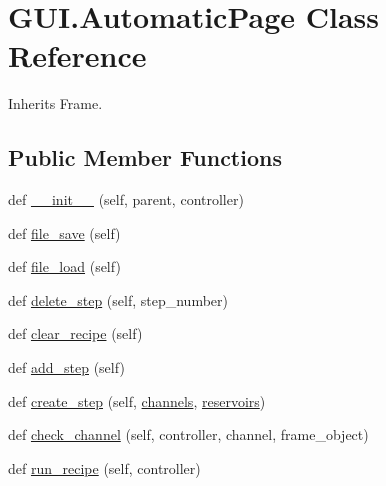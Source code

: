 \hypertarget{class_g_u_i_1_1_automatic_page}{}\section{G\+U\+I.\+Automatic\+Page Class Reference}
\label{class_g_u_i_1_1_automatic_page}


Inherits Frame.

\subsection*{Public Member Functions}
\begin{DoxyCompactItemize}
\item 
def \mbox{\hyperlink{class_g_u_i_1_1_automatic_page_a24bc2991fd2515ec4341b3eaa8c682c6}{\+\_\+\+\_\+init\+\_\+\+\_\+}} (self, parent, controller)
\item 
def \mbox{\hyperlink{class_g_u_i_1_1_automatic_page_a55efb4084de63f91f76fc7d9f8e85e4f}{file\+\_\+save}} (self)
\item 
def \mbox{\hyperlink{class_g_u_i_1_1_automatic_page_aa442c41a4f0959a30bf296a4384a7a0f}{file\+\_\+load}} (self)
\item 
def \mbox{\hyperlink{class_g_u_i_1_1_automatic_page_aea693cdbd377db97bbc87460227c504e}{delete\+\_\+step}} (self, step\+\_\+number)
\item 
def \mbox{\hyperlink{class_g_u_i_1_1_automatic_page_a4b92068bc9984757f343003e84229bb4}{clear\+\_\+recipe}} (self)
\item 
def \mbox{\hyperlink{class_g_u_i_1_1_automatic_page_a8ebd8c7b250fbb945a7255ba42bed48d}{add\+\_\+step}} (self)
\item 
def \mbox{\hyperlink{class_g_u_i_1_1_automatic_page_ac8a09650fd67fa404ee6d45a27cb11ed}{create\+\_\+step}} (self, \mbox{\hyperlink{class_g_u_i_1_1_automatic_page_aa8288b58ed4106b306f856ab38b68492}{channels}}, \mbox{\hyperlink{class_g_u_i_1_1_automatic_page_ae266da43d4b654f697f62b46e34fa8c0}{reservoirs}})
\item 
def \mbox{\hyperlink{class_g_u_i_1_1_automatic_page_a4281ddefe815f6e04513e8e0342974b6}{check\+\_\+channel}} (self, controller, channel, frame\+\_\+object)
\item 
def \mbox{\hyperlink{class_g_u_i_1_1_automatic_page_a583b326d8206caf80794251790de6ded}{run\+\_\+recipe}} (self, controller)
\end{DoxyCompactItemize}

